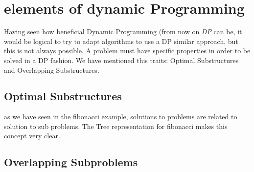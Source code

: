 \section{elements of dynamic Programming}

Having seen how beneficial Dynamic Programming (from now on \emph{DP} can be, it would be logical to
try to adapt algorithms to use a DP similar approach, but this is not always possible.
A problem must have specific properties in order to be solved in a DP fashion. We have
mentioned this traits: Optimal Substructures and Overlapping Substructures.

\subsection{Optimal Substructures}

as we have seen in the fibonacci example, solutions to problems are 
related to solution to sub problems. The Tree representation for fibonacci makes
this concept very clear.

\subsection{Overlapping Subproblems}